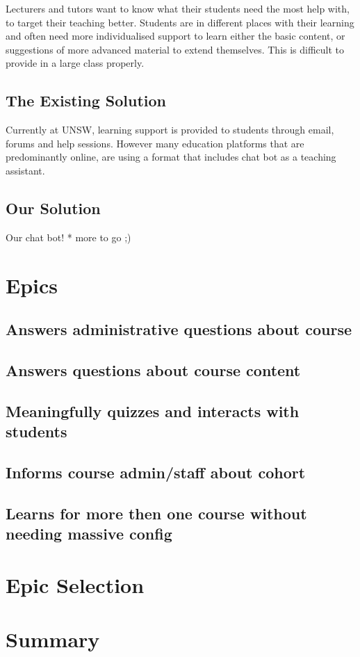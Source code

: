 \documentclass{article}
\begin{document}
Lecturers and tutors want to know what their students need the most help with, to target their teaching better. Students are in different 
places with their learning and often need more individualised support to learn either the basic content, or suggestions of more advanced 
material to extend themselves. This is difficult to provide in a large class properly.

\subsection{The Existing Solution}
Currently at UNSW, learning support is provided to students through email, forums and help sessions. However many education
platforms that are predominantly online, are using a format that includes chat bot as a teaching assistant.

\subsection{Our Solution}
Our chat bot! * more to go ;) 

\section{Epics}
\subsection{Answers administrative questions about course}


\subsection{Answers questions about course content}


\subsection{Meaningfully quizzes and interacts with students}


\subsection{Informs course admin/staff about cohort}


\subsection{Learns for more then one course without needing massive config}

\section{Epic Selection}

\section{Summary}
\end{document}
